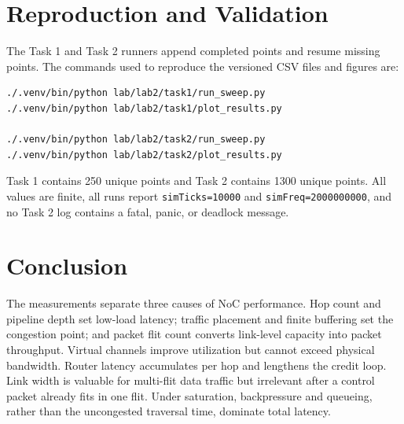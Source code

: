 \documentclass[11pt,a4paper]{article}
\newcommand{\code}[1]{\texttt{#1}}
\begin{document}
\section{Reproduction and Validation}

The Task 1 and Task 2 runners append completed points and resume missing points.
The commands used to reproduce the versioned CSV files and figures are:

\begin{lstlisting}[language=bash]
./.venv/bin/python lab/lab2/task1/run_sweep.py
./.venv/bin/python lab/lab2/task1/plot_results.py

./.venv/bin/python lab/lab2/task2/run_sweep.py
./.venv/bin/python lab/lab2/task2/plot_results.py
\end{lstlisting}

Task 1 contains 250 unique points and Task 2 contains 1300 unique points. All
values are finite, all runs report \code{simTicks=10000} and
\code{simFreq=2000000000}, and no Task 2 log contains a fatal, panic, or
deadlock message.

\section{Conclusion}

The measurements separate three causes of NoC performance. Hop count and
pipeline depth set low-load latency; traffic placement and finite buffering
set the congestion point; and packet flit count converts link-level capacity
into packet throughput. Virtual channels improve utilization but cannot exceed
physical bandwidth. Router latency accumulates per hop and lengthens the credit
loop. Link width is valuable for multi-flit data traffic but irrelevant after
a control packet already fits in one flit. Under saturation, backpressure and
queueing, rather than the uncongested traversal time, dominate total latency.
\end{document}
